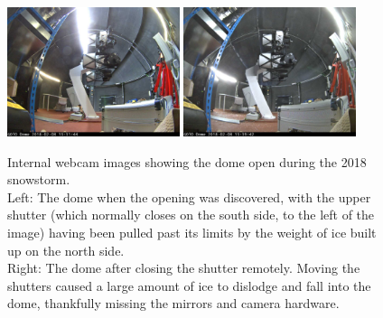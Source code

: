 \begin{colsection}
\begin{colsection}
\begin{figure}[p]
    \begin{center}
        \includegraphics[width=0.45\textwidth]{images/ice_open.jpeg}
        \includegraphics[width=0.45\textwidth]{images/ice_closed.jpeg}
    \end{center}
    \caption[Internal webcam images showing the dome open during a snowstorm]{
        Internal webcam images showing the dome open during the 2018 snowstorm.\\
        Left: The dome when the opening was discovered, with the upper shutter (which normally closes on the south side, to the left of the image) having been pulled past its limits by the weight of ice built up on the north side.\\
        Right: The dome after closing the shutter remotely. Moving the shutters caused a large amount of ice to dislodge and fall into the dome, thankfully missing the mirrors and camera hardware.
    }\label{fig:ice_internal}
\end{figure}


\end{colsection}
\end{colsection}
